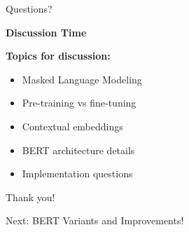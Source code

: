 \documentclass[aspectratio=169]{beamer}
\begin{document}
\begin{frame}{Questions? 🙋}
\begin{center}
\LARGE
\textbf{Discussion Time}
\end{center}

\vspace{1em}

\textbf{Topics for discussion:}
\begin{itemize}\setlength{\itemsep}{0pt}
    \item Masked Language Modeling
    \item Pre-training vs fine-tuning
    \item Contextual embeddings
    \item BERT architecture details
    \item Implementation questions
\end{itemize}

\vspace{1em}

\begin{center}
\Large
Thank you! 🙏

\vspace{1em}

Next: BERT Variants and Improvements!
\end{center}
\end{frame}
\end{document}
